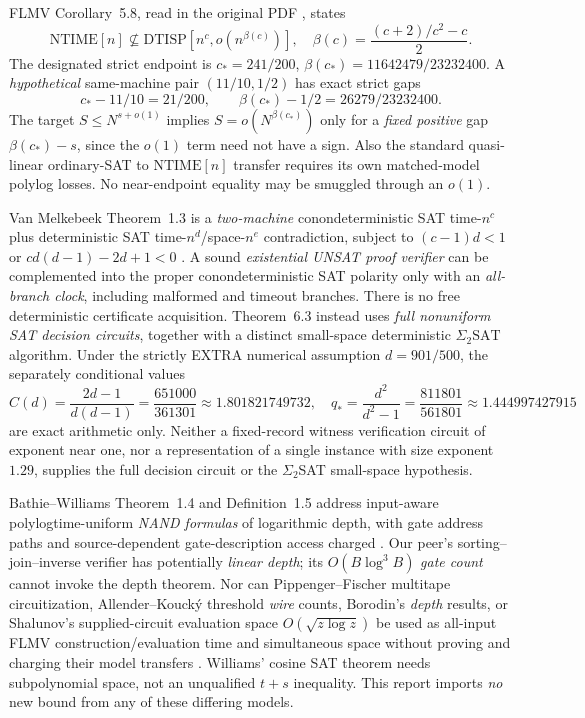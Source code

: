 \documentclass[11pt]{article}
\begin{document}
FLMV Corollary~5.8, read in the original PDF \cite{flmv}, states
\[
\mathrm{NTIME}[n]\not\subseteq\mathrm{DTISP}[n^c,o(n^{\beta(c)})],
\quad\beta(c)=\frac{(c+2)/c^2-c}{2}.\tag{10}
\]
The designated strict endpoint is $c_*=241/200$, $\beta(c_*)=11642479/23232400$. A \emph{hypothetical} same-machine pair $(11/10,1/2)$ has exact strict gaps
\[
 c_*-11/10=21/200,\qquad \beta(c_*)-1/2=26279/23232400.\tag{11}
\]
The target $S\le N^{s+o(1)}$ implies $S=o(N^{\beta(c_*)})$ only for a \emph{fixed positive} gap $\beta(c_*)-s$, since the $o(1)$ term need not have a sign. Also the standard quasi-linear ordinary-SAT to $\mathrm{NTIME}[n]$ transfer requires its own matched-model polylog losses. No near-endpoint equality may be smuggled through an $o(1)$.

Van Melkebeek Theorem~1.3 is a \emph{two-machine} conondeterministic SAT time-$n^c$ plus deterministic SAT time-$n^d$/space-$n^e$ contradiction, subject to $(c-1)d<1$ or $cd(d-1)-2d+1<0$ \cite{vm}. A sound \emph{existential UNSAT proof verifier} can be complemented into the proper conondeterministic SAT polarity only with an \emph{all-branch clock}, including malformed and timeout branches. There is no free deterministic certificate acquisition. Theorem~6.3 instead uses \emph{full nonuniform SAT decision circuits}, together with a distinct small-space deterministic $\Sigma_2\mathrm{SAT}$ algorithm. Under the strictly EXTRA numerical assumption $d=901/500$, the separately conditional values
\[
 C(d)=\frac{2d-1}{d(d-1)}=\frac{651000}{361301}\approx1.801821749732,\quad
q_*=\frac{d^2}{d^2-1}=\frac{811801}{561801}\approx1.444997427915\tag{12}
\]
are exact arithmetic only. Neither a fixed-record witness verification circuit of exponent near one, nor a representation of a single instance with size exponent $1.29$, supplies the full decision circuit or the $\Sigma_2$SAT small-space hypothesis.

Bathie--Williams Theorem~1.4 and Definition~1.5 address input-aware polylogtime-uniform \emph{NAND formulas} of logarithmic depth, with gate address paths and source-dependent gate-description access charged \cite{bw}. Our peer's sorting--join--inverse verifier has potentially \emph{linear depth}; its $O(B\log^3B)$ \emph{gate count} cannot invoke the depth theorem. Nor can Pippenger--Fischer multitape circuitization, Allender--Kouck\'y threshold \emph{wire} counts, Borodin's \emph{depth} results, or Shalunov's supplied-circuit evaluation space $O(\sqrt{z\log z})$ be used as all-input FLMV construction/evaluation time and simultaneous space without proving and charging their model transfers \cite{shalunov}. Williams' cosine SAT theorem needs subpolynomial space, not an unqualified $t+s$ inequality. This report imports \emph{no} new bound from any of these differing models.
\end{document}
